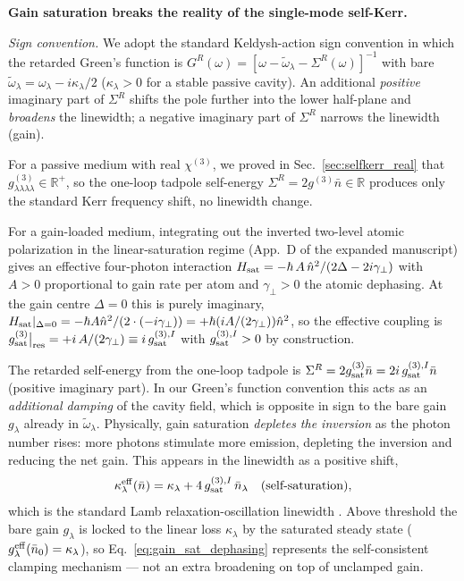 \documentclass[12pt]{article}
\newcommand{\tomega}{\tilde{\omega}}
\begin{document}
\begin{remark}
\textbf{Gain saturation breaks the reality of the single-mode self-Kerr.}

\textit{Sign convention.}  We adopt the standard Keldysh-action sign
convention in which the retarded Green's function is
$G^R(\omega) = [\omega - \tomega_\lambda - \Sigma^R(\omega)]^{-1}$
with bare $\tomega_\lambda = \omega_\lambda - i\kappa_\lambda/2$
($\kappa_\lambda > 0$ for a stable passive cavity).  An additional
\emph{positive} imaginary part of $\Sigma^R$ shifts the pole further
into the lower half-plane and \emph{broadens} the linewidth; a
negative imaginary part of $\Sigma^R$ narrows the linewidth (gain).

For a passive medium with real $\chi^{(3)}$, we proved in
Sec.~\ref{sec:selfkerr_real} that $g^{(3)}_{\lambda\lambda\lambda\lambda}
\in\mathbb{R}^+$, so the one-loop tadpole self-energy
$\Sigma^R = 2g^{(3)}\bar{n}\in\mathbb{R}$ produces only the standard
Kerr frequency shift, no linewidth change.

For a gain-loaded medium, integrating out the inverted two-level
atomic polarization in the linear-saturation regime (App.~D of the
expanded manuscript) gives an effective four-photon interaction
\(H_{\rm sat} = -\hbar\,A\,\hat n^2/(2\Delta - 2i\gamma_\perp)\) with
$A>0$ proportional to gain rate per atom and $\gamma_\perp > 0$ the
atomic dephasing.  At the gain centre $\Delta = 0$ this is purely
imaginary,
\(H_{\rm sat}|_{\Delta=0} = -\hbar A \hat n^2/(2\cdot(-i\gamma_\perp))
= +\hbar(iA/(2\gamma_\perp))\hat n^2\), so the effective coupling is
\(g^{(3)}_{\rm sat}\bigr|_{\rm res} = +i\,A/(2\gamma_\perp)\equiv i\,
g^{(3),I}_{\rm sat}\) with $g^{(3),I}_{\rm sat}>0$ by construction.

The retarded self-energy from the one-loop tadpole is
$\Sigma^R = 2g^{(3)}_{\rm sat}\bar n = 2i\, g^{(3),I}_{\rm sat}\bar n$
(positive imaginary part).  In our Green's function convention
this acts as an \emph{additional damping} of the cavity field, which
is opposite in sign to the bare gain $g_\lambda$ already in
$\tomega_\lambda$.  Physically, gain saturation \emph{depletes the
inversion} as the photon number rises: more photons stimulate more
emission, depleting the inversion and reducing the net gain.  This
appears in the linewidth as a positive shift,
\begin{equation}
  \kappa_\lambda^{\rm eff}(\bar n) = \kappa_\lambda
    + 4\,g^{(3),I}_{\rm sat}\,\bar n_\lambda
    \quad(\text{self-saturation}),
  \label{eq:gain_sat_dephasing}
\end{equation}
which is the standard Lamb relaxation-oscillation linewidth
\cite{Lamb1964}.  Above threshold the bare gain $g_\lambda$ is locked
to the linear loss $\kappa_\lambda$ by the saturated steady state
($g_\lambda^{\rm eff}(\bar n_0)=\kappa_\lambda$), so
Eq.~\eqref{eq:gain_sat_dephasing} represents the self-consistent
clamping mechanism --- not an extra broadening on top of unclamped gain.


\end{remark}
\end{document}
